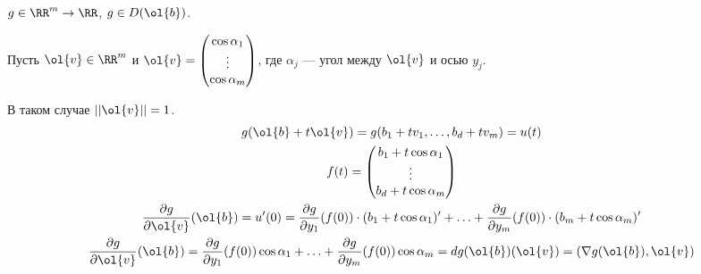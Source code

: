 \begin{example}{}{}
    \( g \in \RR^m \to \RR \), \( g \in D(\ol{b}) \).

    Пусть \( \ol{v} \in \RR^m \) и
    \(
        \ol{v} = \begin{pmatrix}
            \cos \alpha_1
            \\
            \vdots
            \\
            \cos \alpha_m
        \end{pmatrix}
    \), где \( \alpha_j \) --- угол между \( \ol{v} \) и осью \( y_j \).

    В таком случае \( || \ol{v} || = 1 \).
    \begin{gather*}
        g(\ol{b} + t \ol{v}) = g(b_1 + t v_1, \ldots, b_d + t v_m) = u(t)
        \\
        f(t) = \begin{pmatrix}
            b_1 + t \cos \alpha_1
            \\
            \vdots
            \\
            b_d + t \cos \alpha_m
        \end{pmatrix}
        \\
        \frac{\partial g}{\partial \ol{v}} ( \ol{b} )
        =
        u' (0)
        =
        \frac{\partial g}{\partial y_1} (f(0)) \cdot (b_1 + t \cos \alpha_1)'
            +
            \ldots
            +
            \frac{\partial g}{\partial y_m} (f(0)) \cdot (b_m + t \cos \alpha_m)'
        \\
        \frac{\partial g}{\partial \ol{v}} ( \ol{b} )
        =
        \frac{\partial g}{\partial y_1} (f(0)) \cos \alpha_1
            +
            \ldots
            +
            \frac{\partial g}{\partial y_m} (f(0)) \cos \alpha_m
        =
        dg (\ol{b})(\ol{v})
        =
        (\nabla g(\ol{b}), \ol{v})
    \end{gather*}
\end{example}

